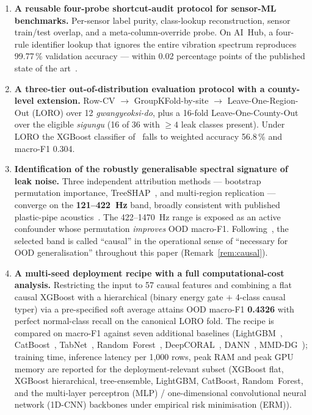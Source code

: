 \documentclass[3p,times,authoryear]{elsarticle}
\theoremstyle{remark}
\begin{document}
\begin{enumerate}
\item \textbf{A reusable four-probe shortcut-audit protocol for
sensor-ML benchmarks.} Per-sensor label purity, class-lookup
reconstruction, sensor train/test overlap, and a
meta-column-override probe. On AI~Hub, a four-rule identifier
lookup that ignores the entire vibration spectrum reproduces
99.77\,\% validation accuracy --- within 0.02 percentage points
of the published state of the art~\cite{lee2023leak}.

\item \textbf{A three-tier out-of-distribution evaluation
protocol with a county-level extension.} Row-CV
$\rightarrow$ GroupKFold-by-site $\rightarrow$
Leave-One-Region-Out (LORO) over 12 \textit{gwangyeoksi-do}, plus a 16-fold
Leave-One-County-Out over the eligible \textit{sigungu} (16 of 36 with
$\geq 4$ leak classes present). Under LORO
the XGBoost classifier of~\cite{lee2023leak} falls to weighted
accuracy 56.8\,\% and macro-F1 0.304.

\item \textbf{Identification of the robustly generalisable spectral
signature of leak noise.} Three independent attribution
methods --- bootstrap permutation importance,
TreeSHAP~\cite{lundberg2017shap}, and multi-region
replication --- converge on the \textbf{121--422~Hz} band,
broadly consistent with published plastic-pipe
acoustics~\cite{hunaidi2000plastic,almeida2014leak,
gao2017model}. The 422--1470~Hz range is exposed as an active
confounder whose permutation \emph{improves} OOD macro-F1.
Following~\cite{arjovsky2019irm,scholkopf2021causal}, the
selected band is called ``causal'' in the operational sense of
``necessary for OOD generalisation'' throughout this paper
(Remark~\ref{rem:causal}).

\item \textbf{A multi-seed deployment recipe with a full
computational-cost analysis.} Restricting the input to 57
causal features and combining a flat causal XGBoost with a
hierarchical (binary energy gate $+$ 4-class causal typer) via
a pre-specified soft average attains OOD macro-F1
\textbf{0.4326} with perfect normal-class recall on the canonical
LORO fold. The recipe is compared on macro-F1 against seven
additional baselines (LightGBM~\cite{ke2017lightgbm},
CatBoost~\cite{prokhorenkova2018catboost},
TabNet~\cite{arik2021tabnet}, Random~Forest~\cite{breiman2001rf},
DeepCORAL~\cite{sun2016coral}, DANN~\cite{ganin2016dann},
MMD-DG~\cite{li2018mmddg}); training time, inference latency per
1{,}000 rows, peak RAM and peak GPU memory are reported for the
deployment-relevant subset (XGBoost flat, XGBoost hierarchical,
tree-ensemble, LightGBM, CatBoost, Random~Forest, and the
multi-layer perceptron (MLP) / one-dimensional convolutional
neural network (1D-CNN) backbones under empirical risk
minimisation (ERM)).
\end{enumerate}
\end{document}

